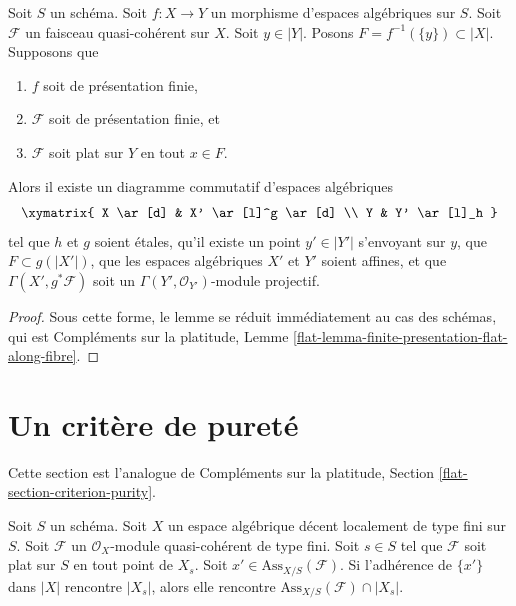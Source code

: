 \begin{lemma}
\label{lemma-finite-presentation-flat-along-fibre}
Soit $S$ un schéma.
Soit $f : X \to Y$ un morphisme d'espaces algébriques sur $S$.
Soit $\mathcal{F}$ un faisceau quasi-cohérent sur $X$.
Soit $y \in |Y|$. Posons $F = f^{-1}(\{y\}) \subset |X|$. Supposons que
\begin{enumerate}
\item $f$ soit de présentation finie,
\item $\mathcal{F}$ soit de présentation finie, et
\item $\mathcal{F}$ soit plat sur $Y$ en tout $x \in F$.
\end{enumerate}
Alors il existe un diagramme commutatif d'espaces algébriques
$$
\xymatrix{
X \ar[d] & X' \ar[l]^g \ar[d] \\
Y & Y' \ar[l]_h
}
$$
tel que $h$ et $g$ soient \'etales, qu'il existe un point
$y' \in |Y'|$ s'envoyant sur $y$, que $F \subset g(|X'|)$,
que les espaces algébriques $X'$ et $Y'$ soient affines, et que
$\Gamma(X', g^*\mathcal{F})$ soit un
$\Gamma(Y', \mathcal{O}_{Y'})$-module projectif.
\end{lemma}

\begin{proof}
Sous cette forme, le lemme se réduit immédiatement
au cas des schémas, qui est
Compléments sur la platitude, Lemme
\ref{flat-lemma-finite-presentation-flat-along-fibre}.
\end{proof}




\section{Un critère de pureté}
\label{section-criterion-purity}

\noindent
Cette section est l'analogue de Compléments sur la platitude, Section
\ref{flat-section-criterion-purity}.

\begin{lemma}
\label{lemma-associated-point-specializes}
Soit $S$ un schéma. Soit $X$ un espace algébrique décent
localement de type fini sur $S$.
Soit $\mathcal{F}$ un $\mathcal{O}_X$-module quasi-cohérent de type fini.
Soit $s \in S$ tel que $\mathcal{F}$ soit plat sur $S$ en tout point de $X_s$.
Soit $x' \in \text{Ass}_{X/S}(\mathcal{F})$. Si
l'adhérence de $\{x'\}$ dans $|X|$ rencontre $|X_s|$, alors elle
rencontre $\text{Ass}_{X/S}(\mathcal{F}) \cap |X_s|$.
\end{lemma}

